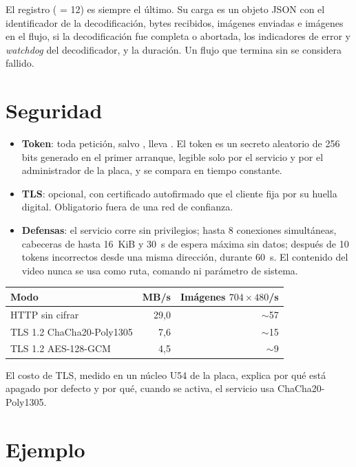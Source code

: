 El registro  ( = 12) es siempre el último. Su carga
es un objeto JSON con el identificador de la decodificación, bytes recibidos, imágenes
enviadas e imágenes en el flujo, si la decodificación fue completa o abortada, los
indicadores de error y \emph{watchdog} del decodificador, y la duración. Un
flujo que termina sin  se considera fallido.

\section{Seguridad}

\begin{itemize}
  \item \textbf{Token}: toda petición, salvo , lleva
    . El token es un secreto aleatorio de
    256 bits generado en el primer arranque, legible solo por el servicio y
    por el administrador de la placa, y se compara en tiempo constante.
  \item \textbf{TLS}: opcional, con certificado autofirmado que el cliente
    fija por su huella digital. Obligatorio fuera de una red de confianza.
  \item \textbf{Defensas}: el servicio corre sin privilegios; hasta 8
    conexiones simultáneas, cabeceras de hasta 16~KiB y 30~s de espera
    máxima sin datos; después de 10 tokens incorrectos desde una misma
    dirección,  durante 60~s. El contenido del video nunca se usa
    como ruta, comando ni parámetro de sistema.
\end{itemize}

\begin{center}\small
\begin{tabular}{@{}l r r@{}}
  \toprule
  \textbf{Modo} & \textbf{MB/s} & \textbf{Imágenes $704 \times 480$/s} \\
  \midrule
  HTTP sin cifrar           & 29,0 & $\sim$57 \\
  TLS 1.2 ChaCha20-Poly1305 & 7,6  & $\sim$15 \\
  TLS 1.2 AES-128-GCM       & 4,5  & $\sim$9 \\
  \bottomrule
\end{tabular}
\end{center}

El costo de TLS, medido en un núcleo U54 de la placa, explica por qué está
apagado por defecto y por qué, cuando se activa, el servicio usa
ChaCha20-Poly1305.

\section{Ejemplo}

